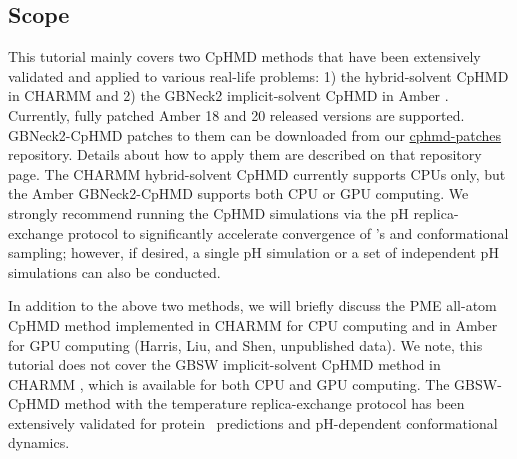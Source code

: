 \subsection{Scope} %
This tutorial mainly covers two CpHMD methods that
have been extensively validated and applied to various real-life problems:
1) the hybrid-solvent CpHMD \cite{Wallace_Shen_2011_J.Chem.TheoryComput.}
in CHARMM \cite{Brooks_Karplus_2009_J.Comput.Chem.}
and
2) the GBNeck2 implicit-solvent CpHMD
\cite{Huang_Shen_2018_J.Chem.Inf.Model.,Harris_Shen_2019_J.Chem.Inf.Model.}
in Amber \cite{Case_Kollman_2018}. Currently, fully patched Amber 18 and 20 released versions are supported. GBNeck2-CpHMD patches to them can be downloaded from our \href{https://gitlab.com/shenlab-amber-cphmd/cphmd-patches}{cphmd-patches} repository. Details about how to apply them are described on that repository page.
The CHARMM hybrid-solvent CpHMD currently supports CPUs only, 
but the Amber GBNeck2-CpHMD supports both CPU or GPU computing.
We strongly recommend running the CpHMD simulations
via the pH replica-exchange protocol to significantly accelerate convergence of \pka's and conformational sampling; however, if desired, a single pH 
simulation or a set of independent pH simulations can also 
be conducted.

In addition to the above two methods, we will briefly
discuss the PME all-atom CpHMD method implemented in
CHARMM for CPU computing \cite{Huang_Shen_2016_J.Chem.TheoryComput.}
and in Amber for GPU computing (Harris, Liu, and Shen, unpublished data). 
We note, this tutorial does not cover the GBSW implicit-solvent CpHMD method in CHARMM 
\cite{Lee_Brooks_2004_Proteins,Khandogin_Brooks_2005_Biophys.J.,Khandogin_Brooks_2006_Biochemistry,Arthur_Brooks_2016_J.Comput.Chem.a}, which is available for both CPU and GPU computing.
The GBSW-CpHMD method with the temperature replica-exchange protocol has been extensively validated for protein \pka\ 
predictions and pH-dependent conformational dynamics.
